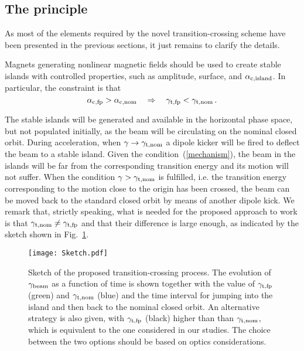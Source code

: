 \documentclass{article}
\begin{document}
\subsection{The principle}
%
As most of the elements required by the novel transition-crossing scheme have been presented in the previous sections, it just remains to clarify the details. 

Magnets generating nonlinear magnetic fields should be used to create stable islands with controlled properties, such as amplitude, surface, and $\alpha_{\rm c, island}$. In particular, the constraint is that
%
\begin{equation}
\alpha_{\rm c, fp} > \alpha_{\rm c, nom} \quad \Rightarrow \quad \gamma_{\rm t, fp} < \gamma_{\rm t, nom} \, .
\label{mechanism}
\end{equation}
%

The stable islands will be generated and available in the horizontal phase space, but not populated initially, as the beam will be circulating on the nominal closed orbit. During acceleration, when $\gamma \to \gamma_{\rm t, nom}$ a dipole kicker will be fired to deflect the beam to a stable island. Given the condition~(\ref{mechanism}), the beam in the islands will be far from the corresponding transition energy and its motion will not suffer. When the condition $\gamma > \gamma_{\rm t, nom}$ is fulfilled, i.e. the transition energy corresponding to the motion close to the origin has been crossed, the beam can be moved back to the standard closed orbit by means of another dipole kick. We remark that, strictly speaking, what is needed for the proposed approach to work is that $\gamma_{\rm t, nom}\neq \gamma_{\rm t, fp}$ and that their difference is large enough, as indicated by the sketch shown in Fig.~\ref{fig:sketch}.
%
\begin{figure}[htb]
\centering
  \texttt{[image: Sketch.pdf]}
  \caption{\label{fig:sketch} Sketch of the proposed transition-crossing process. The evolution of $\gamma_{\rm beam}$ as a function of time is shown together with the value of $\gamma_{\rm t, fp}$ (green) and $\gamma_{\rm t, nom}$ (blue) and the time interval for jumping into the island and then back to the nominal closed orbit. An alternative strategy is also given, with $\gamma_{\rm t, fp}$ (black) higher than than $\gamma_{\rm t, nom}$, which is equivalent to the one considered in our studies. The choice between the two options should be based on optics considerations.}
\end{figure}
%
\end{document}
